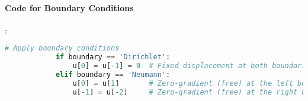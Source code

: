 \documentclass{article}
\begin{document}
		\paragraph{Code for Boundary Conditions} 
		:
		\begin{lstlisting}[language=Python]
			# Apply boundary conditions
			if boundary == 'Dirichlet':
				u[0] = u[-1] = 0  # Fixed displacement at both boundaries
			elif boundary == 'Neumann':
				u[0] = u[1]       # Zero-gradient (free) at the left boundary
				u[-1] = u[-2]     # Zero-gradient (free) at the right boundary
		\end{lstlisting}
		
		\begin{comment}
		
		\paragraph{Explanation of the Boundary Condition Code}
		
		1. **Dirichlet Condition**: 
		- If \texttt{boundary} is set to \texttt{'Dirichlet'}, the boundary points \( u[0] \) and \( u[N_x] \) are set to zero, representing fixed ends.
		
		2. **Neumann Condition**:
		- If \texttt{boundary} is set to \texttt{'Neumann'}, the values at \( u[0] \) and \( u[N_x] \) are set to equal their neighboring points (\( u[1] \) and \( u[N_x - 1] \)), implementing a free boundary condition where the gradient of \( u \) at the boundary is zero.
			
		
		
		\paragraph{Array Update After Each Time Step}
		
		After computing the new displacement \( u \), the arrays are updated for the next iteration:
		\[
		u_2[:] = u_1, \quad u_1[:] = u.
		\]
		This update ensures that \( u_1 \) and \( u_2 \) hold the displacement values from the previous two time steps, maintaining consistency in the time-stepping scheme.
		
		\subsubsection{Summary of Time-Stepping Loop}
		
		The time-stepping loop allows the solver to simulate the wave propagation over the specified time duration \( T \). By applying the appropriate update formula and boundary conditions at each step, the loop ensures accurate modeling of the wave dynamics across the spatial domain.
		
		\end{comment}
		
\end{document}
